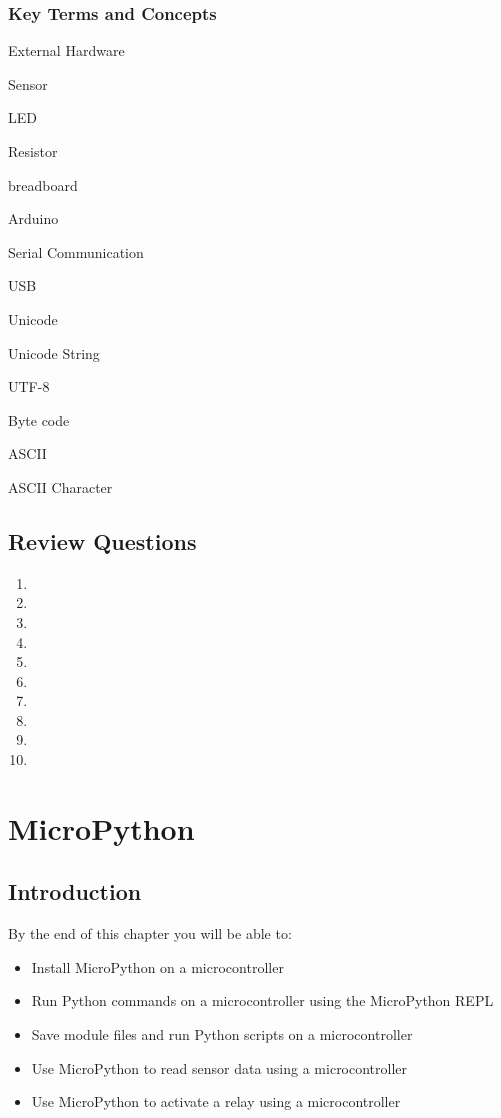 \documentclass{book}
\begin{document}
    \subsection{Key Terms and Concepts}\label{key-terms-and-concepts}

    External Hardware

Sensor

LED

Resistor

breadboard

Arduino

Serial Communication

USB

Unicode

Unicode String

UTF-8

Byte code

ASCII

ASCII Character

    \section{Review Questions}\label{review-questions}

    \begin{enumerate}
\def\labelenumi{\arabic{enumi}.}
\item
\item
\item
\item
\item
\item
\item
\item
\item
\item
\end{enumerate}

    \chapter{MicroPython}\label{micropython}

    \section{Introduction}\label{introduction}

    By the end of this chapter you will be able to:

\begin{itemize}
\item
  Install MicroPython on a microcontroller
\item
  Run Python commands on a microcontroller using the MicroPython REPL
\item
  Save module files and run Python scripts on a microcontroller
\item
  Use MicroPython to read sensor data using a microcontroller
\item
  Use MicroPython to activate a relay using a microcontroller
\end{itemize}
\end{document}
